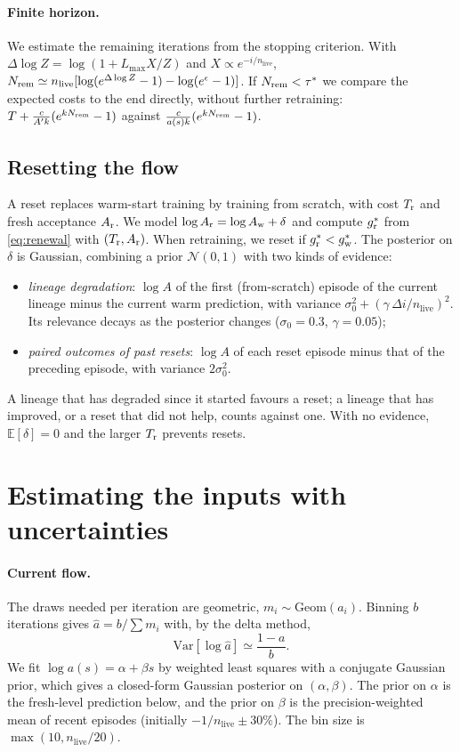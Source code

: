 \documentclass[11pt,a4paper]{article}
\newcommand{\E}{\mathbb{E}}
\newcommand{\Var}{\mathrm{Var}}
\newcommand{\nlive}{n_{\mathrm{live}}}
\begin{document}
\paragraph{Finite horizon.} We estimate the remaining iterations from the
stopping criterion. With $\Delta\log Z = \log(1+L_{\max}X/Z)$ and
$X\propto e^{-i/\nlive}$,
$N_{\rm rem}\simeq\nlive[\log(e^{\Delta\log Z}-1)-\log(e^{\epsilon}-1)]$.
If $N_{\rm rem}<\tau^*$ we compare the expected costs to the end directly,
without further retraining:
$T + \frac{c}{A'k}(e^{kN_{\rm rem}}-1)$ against
$\frac{c}{a(s)k}(e^{kN_{\rm rem}}-1)$.

\subsection{Resetting the flow}

A reset replaces warm-start training by training from scratch, with cost
$T_{\rm r}$ and fresh acceptance $A_{\rm r}$. We model
$\log A_{\rm r} = \log A_{\rm w} + \delta$ and compute $g^*_{\rm r}$ from
\eqref{eq:renewal} with $(T_{\rm r}, A_{\rm r})$. When retraining, we reset
if $g^*_{\rm r}<g^*_{\rm w}$. The posterior on $\delta$ is Gaussian, combining
a prior $\mathcal N(0,1)$ with two kinds of evidence:
\begin{itemize}
  \item \emph{lineage degradation}: $\log A$ of the first (from-scratch)
        episode of the current lineage minus the current warm prediction, with
        variance $\sigma_0^2 + (\gamma\,\Delta i/\nlive)^2$. Its relevance
        decays as the posterior changes ($\sigma_0=0.3$, $\gamma=0.05$);
  \item \emph{paired outcomes of past resets}: $\log A$ of each reset episode
        minus that of the preceding episode, with variance $2\sigma_0^2$.
\end{itemize}
A lineage that has degraded since it started favours a reset; a lineage that
has improved, or a reset that did not help, counts against one. With no
evidence, $\E[\delta]=0$ and the larger $T_{\rm r}$ prevents resets.

\section{Estimating the inputs with uncertainties}

\paragraph{Current flow.} The draws needed per iteration are geometric,
$m_i\sim\mathrm{Geom}(a_i)$. Binning $b$ iterations gives
$\hat a = b/\sum m_i$ with, by the delta method,
\begin{equation}
  \Var[\log\hat a]\simeq \frac{1-a}{b}.
\end{equation}
We fit $\log a(s)=\alpha+\beta s$ by weighted least squares with a conjugate
Gaussian prior, which gives a closed-form Gaussian posterior on
$(\alpha,\beta)$. The prior on $\alpha$ is the fresh-level prediction below,
and the prior on $\beta$ is the precision-weighted mean of recent episodes
(initially $-1/\nlive\pm30\%$). The bin size is $\max(10,\nlive/20)$.
\end{document}
